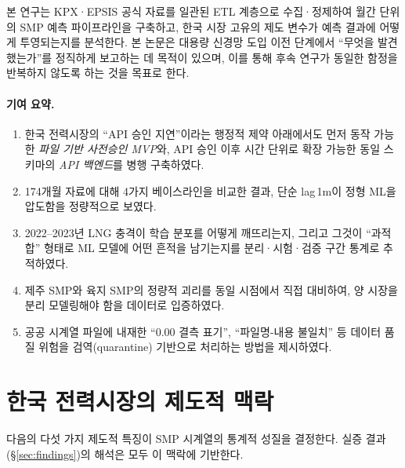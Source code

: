 \documentclass[11pt,a4paper]{article}
\begin{document}
본 연구는 KPX·EPSIS 공식 자료를 일관된 ETL 계층으로 수집·정제하여
월간 단위의 SMP 예측 파이프라인을 구축하고, 한국 시장 고유의
제도 변수가 예측 결과에 어떻게 투영되는지를 분석한다. 본 논문은
대용량 신경망 도입 이전 단계에서 ``무엇을 발견했는가''를 정직하게
보고하는 데 목적이 있으며, 이를 통해 후속 연구가 동일한 함정을
반복하지 않도록 하는 것을 목표로 한다.

\paragraph{기여 요약.}
\begin{enumerate}[leftmargin=1.6em]
  \item 한국 전력시장의 ``API 승인 지연''이라는 행정적 제약 아래에서도
        먼저 동작 가능한 \emph{파일 기반 사전승인 MVP}와, API 승인 이후
        시간 단위로 확장 가능한 동일 스키마의 \emph{API 백엔드}를
        병행 구축하였다.
  \item 174개월 자료에 대해 4가지 베이스라인을 비교한 결과,
        단순 lag\,1m이 정형 ML을 압도함을 정량적으로 보였다.
  \item 2022--2023년 LNG 충격이 학습 분포를 어떻게 깨뜨리는지,
        그리고 그것이 ``과적합'' 형태로 ML 모델에 어떤 흔적을 남기는지를
        분리·시험·검증 구간 통계로 추적하였다.
  \item 제주 SMP와 육지 SMP의 정량적 괴리를 동일 시점에서 직접
        대비하여, 양 시장을 분리 모델링해야 함을 데이터로 입증하였다.
  \item 공공 시계열 파일에 내재한 ``0.00 결측 표기'', ``파일명-내용 불일치''
        등 데이터 품질 위험을 검역(quarantine) 기반으로 처리하는 방법을
        제시하였다.
\end{enumerate}

\section{한국 전력시장의 제도적 맥락}
\label{sec:context}

다음의 다섯 가지 제도적 특징이 SMP 시계열의 통계적 성질을 결정한다.
실증 결과(\S\ref{sec:findings})의 해석은 모두 이 맥락에 기반한다.
\end{document}
